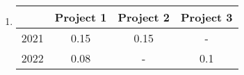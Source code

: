\documentclass[12pt,a4paper]{article}
\makeatletter
\newtheorem*{solution}{Solution}
\theoremstyle{definition}
\renewenvironment{solution}[1][Solution] {\par\pushQED{\qed}\normalfont\topsep6\p@\@plus6\p@\relax\trivlist\item[\hskip\labelsep\bfseries#1\@addpunct{.}]\ignorespaces}{\popQED\endtrivlist\@endpefalse} \makeatother
\makeatother
\begin{document}
\begin{enumerate}
\begin{enumerate}
\begin{solution}
      \begin{tabular}{c|ccc}
              & \bfseries Project 1 & \bfseries Project 2 & \bfseries Project 3\\
        \hline
        2021 & 0.15 & 0.15 & - \\
        2022 & 0.08 & - & 0.1 \\
      \end{tabular}
    \end{solution}


\end{enumerate}
\end{enumerate}
\end{document}
